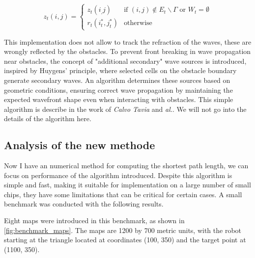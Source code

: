 \documentclass[../main.tex]{subfiles}
\begin{document}
$$z_t (i, j) = 
\begin{cases}
	z_t(i_, j) & \text{if } (i, j) \notin E_t \backslash \Gamma \text{ or } W_t = \emptyset\\
	r_t(i_t^{*}, j_t^{*}) & \text{otherwise}
\end{cases}
$$

This implementation does not allow to track the refraction of the waves, these are wrongly reflected by the obstacles. To prevent front breaking in wave propagation near obstacles, the concept of "additional secondary" wave sources is introduced, inspired by Huygens' principle, where selected cells on the obstacle boundary generate secondary waves. An algorithm determines these sources based on geometric conditions, ensuring correct wave propagation by maintaining the expected wavefront shape even when interacting with obstacles. This simple algorithm is describe in the work of \textit{Calvo Tavia} and \textit{al.}\cite{tapia_2016}. We will not go into the details of the algorithm here.


\subsection{Analysis of the new methode}

Now I have an numerical method for computing the shortest path length, we can focus on performance of the algorithm introduced. Despite this algorithm is simple and fast, making it suitable for implementation on a large number of small chips, they have some limitations that can be critical for certain cases. A small benchmark was conducted with the following results.


Eight maps were introduced in this benchmark, as shown in \autoref{fig:benchmark_maps}. The maps are 1200 by 700 metric units, with the robot starting at the triangle located at coordinates (100, 350) and the target point at (1100, 350).
\end{document}
